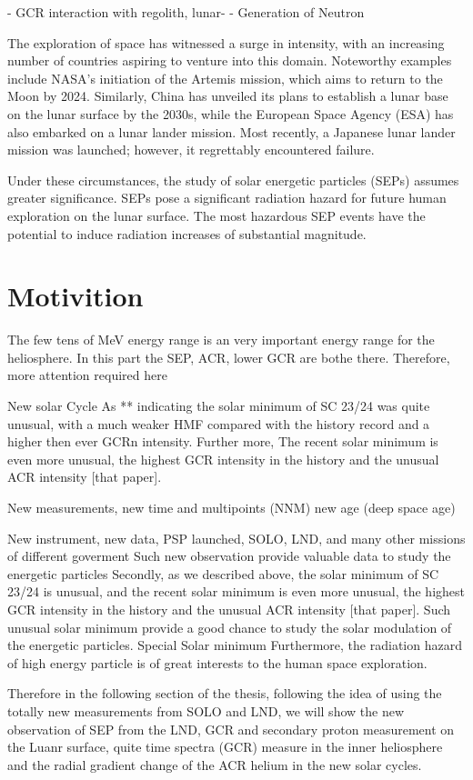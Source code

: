 - GCR interaction with regolith, lunar-
	- Generation of Neutron

The exploration of space has witnessed a surge in intensity, with an increasing number of countries aspiring to venture into this domain. Noteworthy examples include NASA's initiation of the Artemis mission, which aims to return to the Moon by 2024. Similarly, China has unveiled its plans to establish a lunar base on the lunar surface by the 2030s, while the European Space Agency (ESA) has also embarked on a lunar lander mission. Most recently, a Japanese lunar lander mission was launched; however, it regrettably encountered failure.

Under these circumstances, the study of solar energetic particles (SEPs) assumes greater significance. SEPs pose a significant radiation hazard for future human exploration on the lunar surface. The most hazardous SEP events have the potential to induce radiation increases of substantial magnitude.

\section{Motivition}

The few tens of MeV energy range is an very important energy range for the heliosphere. In this part the SEP, ACR, lower GCR are bothe there. Therefore, more attention required here

New solar Cycle
As ** indicating the solar minimum of SC 23/24 was quite unusual, with a much weaker \ac{HMF} compared with the history record and a higher then ever GCRn intensity. Further more, The recent solar minimum 
is even more unusual, the highest GCR intensity in the history and the unusual ACR intensity [that paper]. 



New measurements, new time and multipoints (NNM)
new age (deep space age)

New instrument, new data, PSP launched, SOLO, LND, and many other missions of different goverment
Such new observation provide valuable data to study the energetic particles
Secondly, as we described above, the solar minimum of SC 23/24 is unusual, and the recent solar minimum is even more unusual, the highest GCR intensity in the history and the unusual ACR intensity [that paper]. Such unusual solar minimum provide a good chance to study the solar modulation of the energetic particles. Special Solar minimum
Furthermore, the radiation hazard of high energy particle is of great interests to the human space exploration. 


Therefore in the following section of the thesis, following the idea of using the totally new measurements from SOLO and LND, we will show the new observation of SEP from the LND, GCR and secondary proton measurement on the Luanr surface, quite time spectra (GCR) measure in the inner heliosphere and the radial gradient change of the ACR helium in the new solar cycles.